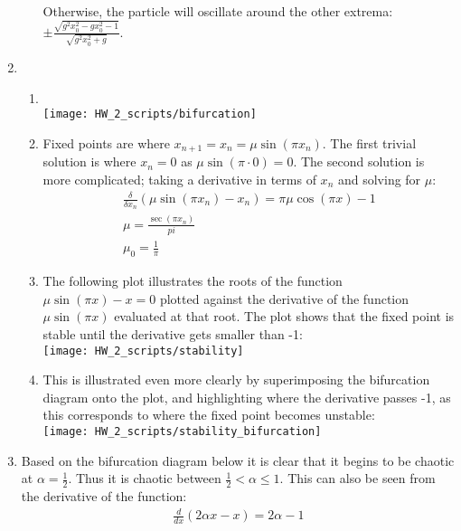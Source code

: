 \documentclass[12pt]{article}
\begin{document}
\begin{enumerate}
\begin{enumerate}
      Otherwise, the particle will oscillate around the other extrema: $\pm\frac{\sqrt{g^2 x_0^2-gx_0^2-1}}{\sqrt{g^2 x_0^2+g}}$.
    \end{enumerate}
    \item\\
    \begin{enumerate}
      \item\\
      
      \texttt{[image: HW\_2\_scripts/bifurcation]}
      \item
      Fixed points are where $x_{n+1}=x_n=\mu\sin\left(\pi x_n\right)$.
      The first trivial solution is where $x_n=0$ as $\mu\sin\left(\pi\cdot0\right)=0$.
      The second solution is more complicated;
      taking a derivative in terms of $x_n$ and solving for $\mu$:
      \begin{gather*}
        \frac{\delta}{\delta x_n}\left(\mu\sin\left(\pi x_n\right)-x_n\right)=\pi\mu\cos(\pi x)-1\\
        \mu=\frac{\sec(\pi x_n)}{pi}\\
        \mu_0=\frac{1}{\pi}
      \end{gather*}
      \item
      The following plot illustrates the roots of the function $\mu\sin(\pi x)-x=0$ plotted against the derivative of the function $\mu\sin(\pi x)$ evaluated at that root.
      The plot shows that the fixed point is stable until the derivative gets smaller than -1:\\
      \texttt{[image: HW\_2\_scripts/stability]}
      \item This is illustrated even more clearly by superimposing the bifurcation diagram onto the plot, and highlighting where the derivative passes -1, as this corresponds to where the fixed point becomes unstable:\\
      \texttt{[image: HW\_2\_scripts/stability\_bifurcation]}
      
    \end{enumerate}
    \item
    Based on the bifurcation diagram below it is clear that it begins to be chaotic at $\alpha=\frac{1}{2}$.
    Thus it is chaotic between $\frac{1}{2}<\alpha\leq1$.
    This can also be seen from the derivative of the function:
    \begin{gather*}
      \frac{d}{dx}\left(2\alpha x-x\right)=2\alpha-1
    \end{gather*}

\end{enumerate}
\end{document}
